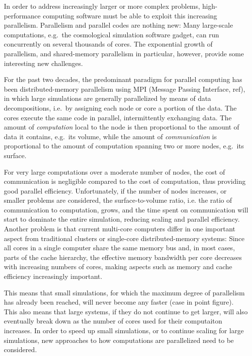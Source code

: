 \documentclass[final]{siamltex}
\begin{document}

In order to address increasingly larger
or more complex problems, high-performance computing software
must be able to exploit this increasing parallelism.
Parallelism and parallel codes are nothing new:
Many large-scale computations, e.g.~the cosmological
simulation software {\sc gadget}, can run concurrently
on several thousands of cores.
The exponential growth of parallelism, and shared-memory
parallelism in particular, however, provide some interesting 
new challenges.

For the past two decades, the predominant paradigm for parallel
computing has been distributed-memory parallelism using MPI
(Message Passing Interface, ref),
in which large simulations are generally
parallelized by means of data decompositions, i.e.~by assigning
each node or core a portion of the data.
The cores execute the same code
in parallel, intermittently exchanging data.
The amount of {\em computation} local to the node is then proportional
to the amount of data it contains, e.g.~its volume, while
the amount of {\em communication} is proportional to the
amount of computation spanning two or more nodes, e.g.~its
surface.

For very large computations over a moderate number of nodes,
the cost of communication is negligible compared to the
cost of computation, thus providing good parallel efficiency.
Unfortunately, if the number of nodes increases, or 
smaller problems are considered, the surface-to-volume ratio,
i.e. the ratio of communication to computation,
grows, and the time spent on communication will start to
dominate the entire simulation, reducing scaling and parallel
efficiency.
Another problem is that current multi-core computers
differ in one important aspect from traditional clusters or
single-core distributed-memory
systems: Since all cores in a single computer share the same memory
bus and, in most cases, parts of the cache hierarchy,
the effective memory bandwidth per core decreases with
increasing numbers of cores,
making aspects such as memory and cache efficiency
increasingly important.

This means that small simulations, for which the
maximum degree of parallelism has already been reached, will never
become any faster (case in point figure).
This also means that large systems, if they do not continue
to get larger, will also eventually break down as the number
of cores used for their computaiton increases.
In order to speed up small simulations, or to continue
scaling for large simulations, new approaches to how
computations are parallelized need to be considered.
\end{document}
